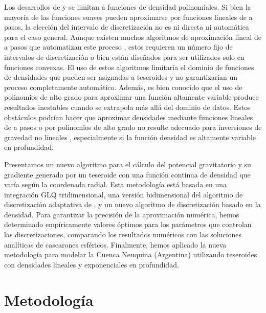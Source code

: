 Los desarrollos de \citet{lin2019} y \citet{fukushima2018} se limitan
a funciones de densidad polinomiales.
Si bien la mayoría de las funciones suaves pueden aproximarse por funciones
lineales de a pasos, la elección del intervalo de discretización no es ni
directa ni automática para el caso general.
Aunque existen muchos algoritmos de aproximación lineal de a pasos que
automatizan este proceso \citep{ketkov1969, vandewalle1975, imamoto2008,
ahmadi2013}, estos requieren un número fijo de intervalos de discretización
o bien están diseñados para ser utilizados solo en funciones convexas.
El uso de estos algoritmos limitaría el dominio de funciones de densidades que
pueden ser asignadas a teseroides y no garantizarían un proceso completamente
automático.
Además, es bien conocido que el uso de polinomios de alto grado para aproximar
una función altamente variable produce resultados inestables cuando se
extrapola más allá del dominio de datos.
Estos obstáculos podrían hacer que aproximar densidades mediante funciones
lineales de a pasos o por polinomios de alto grado no resulte adecuado para
inversiones de gravedad no lineales \citep[e.g.][]{uieda2017}, especialmente si
la función densidad es altamente variable en profundidad.

Presentamos un nuevo algoritmo para el cálculo del potencial gravitatorio y su
gradiente generado por un teseroide con una función continua de densidad que
varía según la coordenada radial.
Esta metodología está basada en una integración \ac{GLQ} tridimensional, una
versión bidimensional del algoritmo de discretización adaptativa de
\citet{uieda2016} \citep[de acuerdo con~][]{lin2019}, y un nuevo algoritmo
de discretización basado en la densidad.
Para garantizar la precisión de la aproximación numérica, hemos determinado
empíricamente valores óptimos para los parámetros que controlan las
discretizaciones, comparando los resultados numéricos con las soluciones
analíticas de cascarones esféricos.
Finalmente, hemos aplicado la nueva metodología para modelar la Cuenca
Neuquina (Argentina) utilizando teseroides con densidades lineales
y exponenciales en profundidad.


\section{Metodología}

